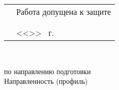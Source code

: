 \thispagestyle{empty}%
\makeatletter
{}
%
\makeatother

{\centering%
	\Ministry\\
	\SPbPU\\
	{%
		\institute}
\par}%


\vspace{0pt plus1fill} %


\noindent
\begin{minipage}{\linewidth}
	\vspace{\mfloatsep} %
	\begin{tabularx}{\linewidth}{Xl}
	&Работа допущена к защите     \\
	&\HeadTitle     \\			
	&\underline{\hspace*{0.1\textheight}} \Head     \\
	&<<\underline{\hspace*{0.05\textheight}}>> \underline{\hspace*{0.1\textheight}} \thesisYear~г.  \\ 
	\end{tabularx}
	\vspace{\mfloatsep} %
\end{minipage}


\vspace{0pt plus2fill} %


{\centering%
	
	\MakeUppercase{\bfseries{}\DocType} \\ 
	\MakeUppercase{\thesisDegree}%


{\centering%
	\MakeUppercase{\bfseries{\thesisTitle}}}%

}\par%

\noindent	по направлению подготовки \thesisSpecialtyCodeAndTitle{}\\%
\noindent	Направленность (профиль)	\thesisOPCodeAndTitle %
\par%





